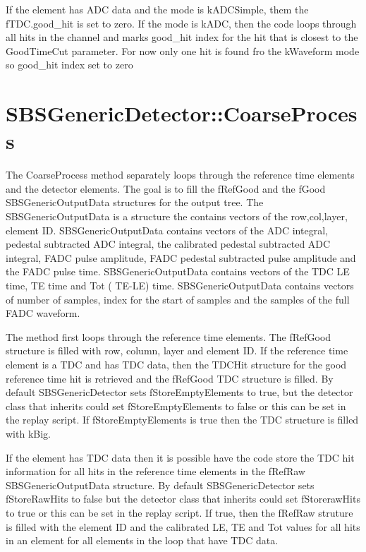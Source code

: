 \documentclass[11pt]{article}
\begin{document}
If the element has ADC data and the mode is kADCSimple, them the  fTDC.good\_hit is set to zero.
If the mode is kADC, then the code loops through all hits in the channel and marks
good\_hit index for the hit that is closest  to the GoodTimeCut parameter.
{\color{red} For now only one hit is found fro the kWaveform mode so good\_hit index set to zero}



\section{SBSGenericDetector::CoarseProcess}
The CoarseProcess method separately loops through the reference time elements and the detector elements.
The goal is to fill the fRefGood and the fGood SBSGenericOutputData structures for the output tree. The
SBSGenericOutputData is a structure the contains vectors of the row,col,layer, element ID.
SBSGenericOutputData contains vectors of the ADC integral, pedestal subtracted ADC integral, 
the calibrated   pedestal subtracted ADC integral, FADC pulse amplitude, FADC pedestal subtracted pulse amplitude
and the FADC pulse time. SBSGenericOutputData contains vectors of the TDC LE time, TE time and Tot ( TE-LE) time.
 SBSGenericOutputData contains vectors of  number of samples, index for the start of 
 samples and the samples of the full FADC waveform.
 
 The method first loops through the reference time elements. The fRefGood structure 
 is filled with row, column, layer and element ID. If the reference time element is
 a TDC and has TDC data, then the TDCHit structure for the good reference time hit is retrieved
 and the fRefGood TDC structure is filled.
 By default SBSGenericDetector sets fStoreEmptyElements to true, but the detector class that inherits 
 could set  fStoreEmptyElements to false or this can be set in the replay script.
  If  fStoreEmptyElements is true then the TDC structure is filled with kBig.
 
If the element has TDC data then it is possible have the code store the TDC hit information for
all hits in the reference time elements in the fRefRaw SBSGenericOutputData structure.
 By default SBSGenericDetector sets fStoreRawHits to false but the detector class that inherits 
 could set  fStorerawHits to true or this can be set in the replay script.
 If true, then the fRefRaw struture is filled with the element ID and the calibrated LE, TE and Tot values
 for all hits in an element for all elements in the loop that have TDC data.
 
\end{document}
